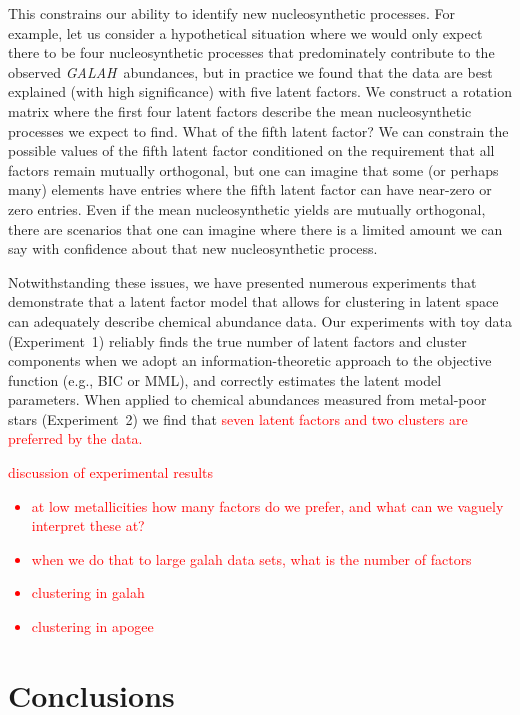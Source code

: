 \documentclass[twocolumn]{aastex62}
\newcommand{\project}[1]{\textsl{#1}}
\newcommand{\GALAH}{\project{GALAH}}
\newcommand{\todo}[1]{\textcolor{red}{#1}}
\begin{document}
This constrains our ability to identify new nucleosynthetic processes. For example,
let us consider a hypothetical situation where we would only expect there to be four 
nucleosynthetic processes that predominately contribute to the observed \GALAH\ abundances,
but in practice we found that the data are best explained (with high significance) with
five latent factors. We construct a rotation matrix where the first four latent factors
describe the mean nucleosynthetic processes we expect to find. What of the fifth latent
factor? We can constrain the possible values of the fifth latent factor conditioned on
the requirement that all factors remain mutually orthogonal, but one can imagine that
some (or perhaps many) elements have entries where the fifth latent factor can have
near-zero or zero entries. Even if the mean nucleosynthetic yields are mutually
orthogonal, there are scenarios that one can imagine where there is a limited amount
we can say with confidence about that new nucleosynthetic process.

Notwithstanding these issues, we have presented numerous experiments that demonstrate
that a latent factor model that allows for clustering in latent space can adequately
describe chemical abundance data. Our experiments with toy data (Experiment~1) reliably
finds the true number of latent factors and cluster components when we adopt an information-theoretic approach to the objective function (e.g., BIC or MML), and correctly estimates the latent
model parameters. When applied to chemical abundances measured from metal-poor stars 
(Experiment~2) we find that \todo{seven latent factors and two clusters are preferred by
the data.}

\todo{discussion of experimental results}

\todo{
\begin{itemize}
	\item at low metallicities how many factors do we prefer, and what can we
		  vaguely interpret these at?
	\item when we do that to large galah data sets, what is the number of factors
	\item clustering in galah
	\item clustering in apogee
\end{itemize}
}


\section{Conclusions} \label{sec:conclusion}
\end{document}

